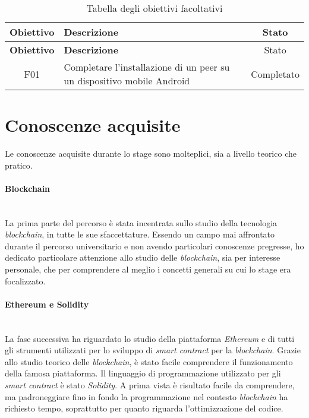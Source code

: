 \begin{center}
	\begin{longtable}{| c | p{23em} | c |}
		\caption{Tabella degli obiettivi facoltativi}
		\label{tab:obiettivi-facoltativi}\\
		\hline
		\textbf{Obiettivo} & \centering\textbf{Descrizione} & Stato\\
		\endfirsthead
		\hline
		\textbf{Obiettivo} & \centering\textbf{Descrizione} & Stato\\
		\endhead
		\endfoot
		
		\hline
		F01    & Completare l'installazione di un peer su un dispositivo mobile Android & Completato\\
		\hline
	\end{longtable}
\end{center}

\section{Conoscenze acquisite}
Le conoscenze acquisite durante lo stage sono molteplici, sia a livello teorico che pratico. 
\paragraph{Blockchain}\mbox{}\\
La prima parte del percorso è stata incentrata sullo studio della tecnologia \textit{blockchain}, in tutte le sue sfaccettature. Essendo un campo mai affrontato durante il percorso universitario e non avendo particolari conoscenze pregresse, ho dedicato particolare attenzione allo studio delle \textit{blockchain}, sia per interesse personale, che per comprendere al meglio i concetti generali su cui lo stage era focalizzato. 
\paragraph{Ethereum e Solidity}\mbox{}\\
La fase successiva ha riguardato lo studio della piattaforma \textit{Ethereum} e di tutti gli strumenti utilizzati per lo sviluppo di \textit{smart contract} per la \textit{blockchain}. Grazie allo studio teorico delle \textit{blockchain}, è stato facile comprendere il funzionamento della famosa piattaforma. Il linguaggio di programmazione utilizzato per gli \textit{smart contract} è stato \textit{Solidity}. A prima vista è risultato facile da comprendere, ma padroneggiare fino in fondo la programmazione nel contesto \textit{blockchain} ha richiesto tempo, soprattutto per quanto riguarda l'ottimizzazione del codice.
